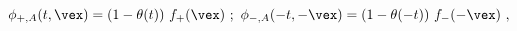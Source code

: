 \begin{equation}
  \phi_{+,A} (t,\vex ) = (1-\theta(t))~f_+(\vex ) \ ; \
  \phi_{-,A} (-t,-\vex ) = (1-\theta(-t))~f_-(-\vex)  \ ,
\end{equation}

